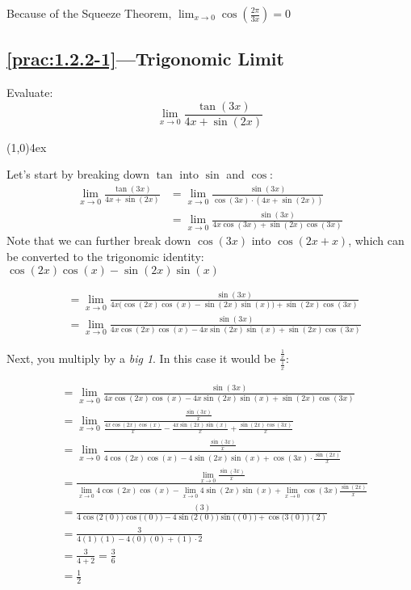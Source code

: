 \documentclass{MathNotes}
\newcommand{\br}{
\begin{center}
\line(1,0){4ex}
\end{center}}
\begin{document}
Because of the Squeeze Theorem, $\displaystyle\lim_{x\to 0}\cos(\frac{2\pi}{3x})=0$

\subsection*{\ref{prac:1.2.2-1}---Trigonomic Limit}\label{ans:1.2.2-2}
Evaluate:
$$\lim_{x\to 0}\frac{\tan(3x)}{4x+\sin(2x)}$$
\br

Let's start by breaking down $\tan$ into $\sin$ and $\cos$:
\begin{align*}
    \lim_{x\to 0}\frac{\tan(3x)}{4x+\sin(2x)}
    &=\lim_{x\to 0}\frac{\sin(3x)}{\cos(3x)\cdot(4x+\sin(2x))}\\
    &=\lim_{x\to 0}\frac{\sin(3x)}{4x\cos(3x)+\sin(2x)\cos(3x)}
\end{align*}
Note that we can further break down $\cos(3x)$ into $\cos(2x+x)$, which can 
be converted to the trigonomic identity:$\cos(2x)\cos(x)-\sin(2x)\sin(x)$

\begin{align*}
    &=\lim_{x\to 0}\frac{\sin(3x)}{4x\big(\cos(2x)\cos(x)-\sin(2x)\sin(x)\big)+\sin(2x)\cos(3x)}\\
    &=\lim_{x\to 0}\frac{\sin(3x)}{4x\cos(2x)\cos(x)-4x\sin(2x)\sin(x)+\sin(2x)\cos(3x)}
\end{align*}

Next, you multiply by a \textit{big 1}. In this case it would be
$\displaystyle\frac{\frac{1}{x}}{\frac{1}{x}}$:

\begin{align*}
    &=\lim_{x\to 0}\frac{\sin(3x)}{4x\cos(2x)\cos(x)-4x\sin(2x)\sin(x)+\sin(2x)\cos(3x)}\\
    &=\lim_{x\to 0}\frac{\frac{\sin(3x)}{x}}{\frac{4x\cos(2x)\cos(x)}{x}-\frac{4x\sin(2x)\sin(x)}{x}+\frac{\sin(2x)\cos(3x)}{x}}\\
    &=\lim_{x\to 0}\frac{\frac{\sin(3x)}{x}}{4\cos(2x)\cos(x)-4\sin(2x)\sin(x)+\cos(3x)\cdot\frac{\sin(2x)}{x}}\\
    &=\frac{\lim_{x\to 0}\frac{\sin(3x)}{x}}{\lim_{x\to 0}4\cos(2x)\cos(x)-\lim_{x\to 0}4\sin(2x)\sin(x)+\lim_{x\to 0}\cos(3x)\frac{\sin(2x)}{x}}\\
    &=\frac{(3)}{4\cos\big(2(0)\big)\cos\big((0)\big)-4\sin\big(2(0)\big)\sin\big((0)\big)+\cos\big(3(0)\big)(2)}\\
    &=\frac{3}{4(1)(1)-4(0)(0)+(1)\cdot 2}\\
    &=\frac{3}{4+2}=\frac{3}{6}\\
    &=\frac{1}{2}
\end{align*}
\end{document}
